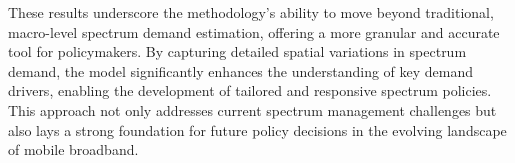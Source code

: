 \documentclass[conference]{IEEEtran}
\begin{document}
These results underscore the methodology's ability to move beyond traditional, macro-level spectrum demand estimation, offering a more granular and accurate tool for policymakers. By capturing detailed spatial variations in spectrum demand, the model significantly enhances the understanding of key demand drivers, enabling the development of tailored and responsive spectrum policies. This approach not only addresses current spectrum management challenges but also lays a strong foundation for future policy decisions in the evolving landscape of mobile broadband.



\end{document}
